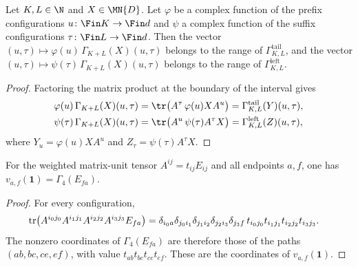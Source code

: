 \begin{lemma}
    \label{thm:spectator-multiplier-interval-space}
    \leanok
    Let $K,L\in\N$ and $X\in\MN{D}$. Let $\varphi$ be a complex function of
    the prefix configurations $u\colon\Fin K\to\Fin d$ and $\psi$ a complex
    function of the suffix configurations $\tau\colon\Fin L\to\Fin d$. Then
    the vector $(u,\tau)\mapsto\varphi(u)\,\Gamma_{K+L}(X)(u,\tau)$ belongs to
    the range of $\Gamma^{\mathrm{tail}}_{K,L}$, and the vector
    $(u,\tau)\mapsto\psi(\tau)\,\Gamma_{K+L}(X)(u,\tau)$ belongs to the range
    of $\Gamma^{\mathrm{left}}_{K,L}$.
\end{lemma}
\begin{proof}\leanok
    Factoring the matrix product at the boundary of the interval gives
    \begin{align}
        \varphi(u)\,\Gamma_{K+L}(X)(u,\tau)
         & =\tr\bigl(A^\tau\,\varphi(u)XA^u\bigr)
        =\Gamma^{\mathrm{tail}}_{K,L}(Y)(u,\tau), \notag \\
        \psi(\tau)\,\Gamma_{K+L}(X)(u,\tau)
         & =\tr\bigl(A^u\,\psi(\tau)A^\tau X\bigr)
        =\Gamma^{\mathrm{left}}_{K,L}(Z)(u,\tau), \notag
    \end{align}
    where $Y_u=\varphi(u)XA^u$ and $Z_\tau=\psi(\tau)A^\tau X$.
\end{proof}

\begin{lemma}
    \label{thm:matrix-unit-path-ground-space}
    \leanok
    For the weighted matrix-unit tensor $A^{ij}=t_{ij}E_{ij}$ and all
    endpoints $a,f$, one has $v_{a,f}(\mathbf 1)=\Gamma_4(E_{fa})$.
\end{lemma}
\begin{proof}
    \leanok
    For every configuration,
    \begin{align}
        \operatorname{tr}\bigl(A^{i_0j_0}A^{i_1j_1}A^{i_2j_2}A^{i_3j_3}E_{fa}\bigr)
         & =\delta_{i_0a}\delta_{j_0i_1}\delta_{j_1i_2}\delta_{j_2i_3}\delta_{j_3f}\,
        t_{i_0j_0}t_{i_1j_1}t_{i_2j_2}t_{i_3j_3}. \notag
    \end{align}
    The nonzero coordinates of $\Gamma_4(E_{fa})$ are therefore those of the
    paths $(ab,bc,ce,ef)$, with value $t_{ab}t_{bc}t_{ce}t_{ef}$. These are
    the coordinates of $v_{a,f}(\mathbf 1)$.
\end{proof}

